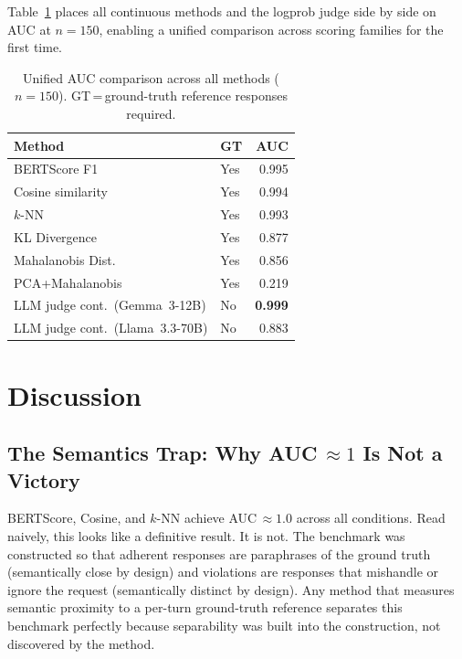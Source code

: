 \documentclass[11pt,a4paper]{article}
\begin{document}
Table~\ref{tab:unified_auc} places all continuous methods and the logprob
judge side by side on AUC at $n = 150$, enabling a unified comparison
across scoring families for the first time.

\begin{table}[ht]
  \centering
  \caption{Unified AUC comparison across all methods ($n = 150$).
           GT\,=\,ground-truth reference responses required.}
  \label{tab:unified_auc}
  \begin{tabular}{llr}
    \toprule
    \textbf{Method} & \textbf{GT} & \textbf{AUC} \\
    \midrule
    BERTScore F1            & Yes & 0.995 \\
    Cosine similarity       & Yes & 0.994 \\
    $k$-NN                  & Yes & 0.993 \\
    KL Divergence           & Yes & 0.877 \\
    Mahalanobis Dist.\      & Yes & 0.856 \\
    PCA+Mahalanobis         & Yes & 0.219 \\
    \midrule
    LLM judge cont.\ (Gemma~3-12B)   & No  & \textbf{0.999} \\
    LLM judge cont.\ (Llama~3.3-70B) & No  & 0.883 \\
    \bottomrule
  \end{tabular}
\end{table}

\newpage
\section{Discussion}
\label{sec:discussion}

\subsection{The Semantics Trap: Why AUC\,$\approx 1$ Is Not a Victory}

BERTScore, Cosine, and $k$-NN achieve AUC\,$\approx 1.0$ across all conditions.
Read naively, this looks like a definitive result. It is not. The benchmark
was constructed so that adherent responses are paraphrases of the ground truth
(semantically close by design) and violations are responses that mishandle or
ignore the request (semantically distinct by design). Any method that measures
semantic proximity to a per-turn ground-truth reference separates this benchmark
perfectly because separability was built into the construction, not discovered
by the method.
\end{document}
